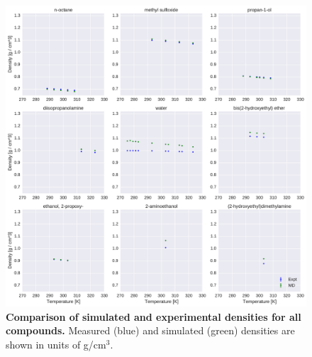 \documentclass[journal=jacsat,manuscript=article]{achemso}
\begin{document}
\begin{figure}[alldensity]


\ContinuedFloat

\includegraphics[width=\textwidth]{./figures/densities_versus_temperature_part1.pdf}

\caption{{\bf Comparison of simulated and experimental densities for all compounds.} 
Measured (blue) and simulated (green) densities are shown in units of g/cm$^{3}$.
\label{figure:AllDensities}
}

\end{figure}
\end{document}
